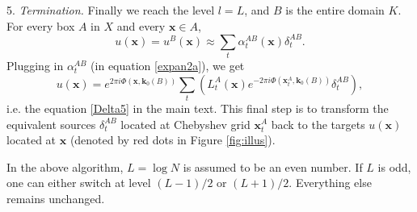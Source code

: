 5.  {\it Termination.} Finally we reach the level $l=L$, and $B$ is the entire domain $K$. For every box $A$ in $X$ and every $\mathbf{x}\in A$, 
\begin{equation}
u(\mathbf{x})=u^{B}(\mathbf{x})\approx \sum_t \alpha_t^{AB}(\mathbf{x})\delta_t^{AB}.
\end{equation}
Plugging in $\alpha_t^{AB}$ (in equation \ref{expan2a}), we get
\begin{equation} \label{delta5}
u(\mathbf{x})=e^{2\pi i
  \Phi(\mathbf{x},\mathbf{k}_0(B))}\sum_t \left( L_t^A(\mathbf{x}) e^{-2\pi i
  \Phi(\mathbf{x}_t^A,\mathbf{k}_0(B))}
  \delta_t^{AB}\right),
\end{equation}
i.e. the equation \ref{Delta5} in the main text. This final step is to transform the equivalent sources $\delta_t^{AB}$ located at Chebyshev grid $\mathbf{x}_t^A$ back to the targets $u(\mathbf{x})$ located at $\mathbf{x}$ (denoted by red dots in Figure \ref{fig:illus}).

In the above algorithm, $L=\log N$ is assumed to be an even number. If $L$ is odd, one can either switch at level $(L-1)/2$ or $(L+1)/2$. Everything else remains unchanged.



\onecolumn


